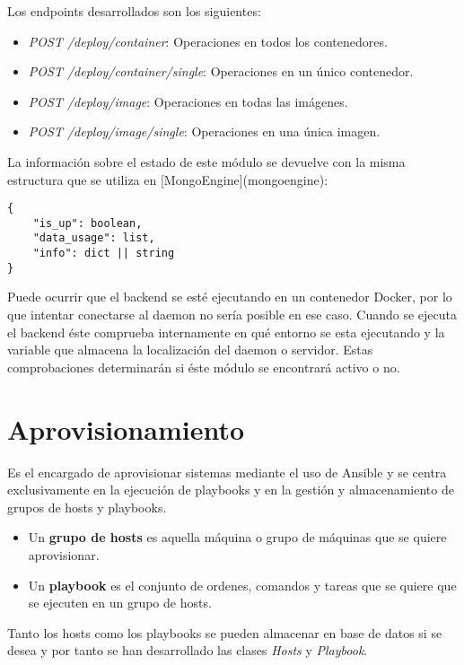 \bigskip
Los endpoints desarrollados son los siguientes:
\begin{itemize}
	\item \textit{POST /deploy/container}: Operaciones en todos los contenedores.
	\item \textit{POST /deploy/container/single}: Operaciones en un único contenedor.
	\item \textit{POST /deploy/image}: Operaciones en todas las imágenes.
	\item \textit{POST /deploy/image/single}: Operaciones en una única imagen.
\end{itemize}


\bigskip
La información sobre el estado de este módulo se devuelve con la misma estructura que se utiliza en [MongoEngine](mongoengine):
\begin{lstlisting}
{
	"is_up": boolean,
	"data_usage": list,
	"info": dict || string
}
\end{lstlisting}



\bigskip
Puede ocurrir que el backend se esté ejecutando en un contenedor Docker, por lo que intentar conectarse al daemon no sería posible en ese caso. Cuando se ejecuta el backend éste comprueba internamente en qué entorno se esta ejecutando y la variable que almacena la localización del daemon o servidor. Estas comprobaciones determinarán si éste módulo se encontrará activo o no.




\section{Aprovisionamiento}


Es el encargado de aprovisionar sistemas mediante el uso de Ansible y se centra exclusivamente en la ejecución de playbooks y en la gestión y almacenamiento de grupos de hosts y playbooks.
\begin{itemize}
	\item Un \textbf{grupo de hosts} es aquella máquina o grupo de máquinas que se quiere aprovisionar.
	\item Un \textbf{playbook} es el conjunto de ordenes, comandos y tareas que se quiere que se ejecuten en un grupo de hosts.
\end{itemize}

\bigskip
Tanto los hosts como los playbooks se pueden almacenar en base de datos si se desea y por tanto se han desarrollado las clases \textit{Hosts} y \textit{Playbook}.



